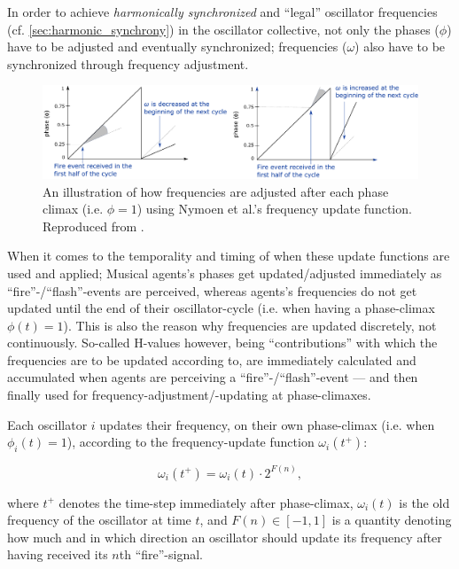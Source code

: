 	In order to achieve \textit{harmonically synchronized} and ``legal'' oscillator frequencies (cf. \ref{sec:harmonic_synchrony}) in the oscillator collective, not only the phases ($\phi$) have to be adjusted and eventually synchronized; frequencies ($\omega$) also have to be synchronized through frequency adjustment.
	
	\begin{figure}[ht!]
		\centering
		\includegraphics[width=\linewidth]{Assets/DocSegments/Chapters/Baseline/Figures/Illustrations/NymoenFrequencyAdjustment.pdf}
		\caption[]{An illustration of how frequencies are adjusted after each phase climax (i.e. $\phi=1$) using Nymoen et al.'s frequency update function. Reproduced from \cite{nymoen_synch}.}
		\label{fig:nymoen_freq_adjust_illustration}
	\end{figure}
	
	When it comes to the temporality and timing of when these update functions are used and applied; Musical agents's phases get updated/adjusted immediately as ``fire''-/``flash''-events are perceived, whereas agents's frequencies do not get updated until the end of their oscillator-cycle (i.e. when having a phase-climax $\phi(t)=1$). This is also the reason why frequencies are updated discretely, not continuously. So-called H-values however, being ``contributions'' with which the frequencies are to be updated according to, are immediately calculated and accumulated when agents are perceiving a ``fire''-/``flash''-event — and then finally used for frequency-adjustment/-updating at phase-climaxes.
	
	Each oscillator $i$ updates their frequency, on their own phase-climax (i.e. when $\phi_i(t)=1$), according to the frequency-update function $\omega_i(t^+)$:

	\begin{equation}
		\omega_i(t^+) = \omega_i(t) \cdot 2^{F(n)},
	\end{equation}

	where $t^+$ denotes the time-step immediately after phase-climax, $\omega_i(t)$ is the old frequency of the oscillator at time $t$, and $F(n) \in [-1,1]$ is a quantity denoting how much and in which direction an oscillator should update its frequency after having received its $n$th ``fire''-signal.

